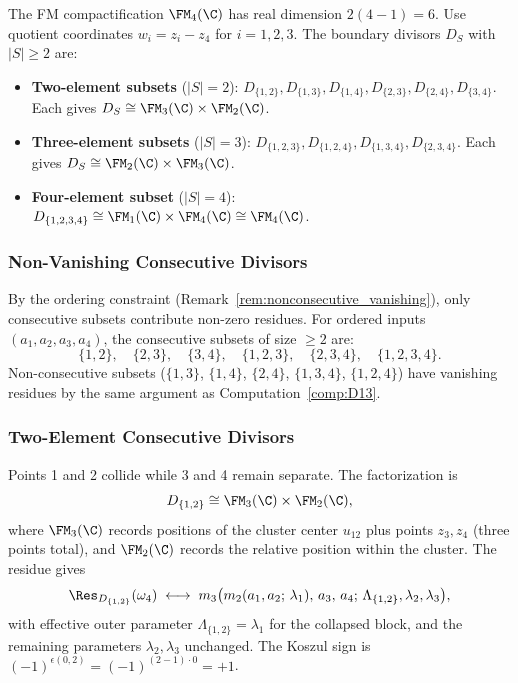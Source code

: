 The FM compactification $\FM_4(\C)$ has real dimension $2(4-1) = 6$. Use quotient coordinates $w_i = z_i - z_4$ for $i = 1, 2, 3$. The boundary divisors $D_S$ with $|S| \geq 2$ are:
\begin{itemize}
\item \textbf{Two-element subsets} ($|S|=2$): $D_{\{1,2\}}, D_{\{1,3\}}, D_{\{1,4\}}, D_{\{2,3\}}, D_{\{2,4\}}, D_{\{3,4\}}$. Each gives $D_S \cong \FM_3(\C) \times \FM_2(\C)$.
\item \textbf{Three-element subsets} ($|S|=3$): $D_{\{1,2,3\}}, D_{\{1,2,4\}}, D_{\{1,3,4\}}, D_{\{2,3,4\}}$. Each gives $D_S \cong \FM_2(\C) \times \FM_3(\C)$.
\item \textbf{Four-element subset} ($|S|=4$): $D_{\{1,2,3,4\}} \cong \FM_1(\C) \times \FM_4(\C) \cong \FM_4(\C)$.
\end{itemize}

\subsubsection{Non-Vanishing Consecutive Divisors}

By the ordering constraint (Remark~\ref{rem:nonconsecutive_vanishing}), only consecutive subsets contribute non-zero residues. For ordered inputs $(a_1, a_2, a_3, a_4)$, the consecutive subsets of size $\geq 2$ are:
\[
\{1,2\},\quad \{2,3\},\quad \{3,4\},\quad \{1,2,3\},\quad \{2,3,4\},\quad \{1,2,3,4\}.
\]
Non-consecutive subsets ($\{1,3\}$, $\{1,4\}$, $\{2,4\}$, $\{1,3,4\}$, $\{1,2,4\}$) have vanishing residues by the same argument as Computation~\ref{comp:D13}.

\subsubsection{Two-Element Consecutive Divisors}

\begin{computation}[$D_{\{1,2\}}$ in $\FM_4(\C)$]
Points 1 and 2 collide while 3 and 4 remain separate. The factorization is
\[
D_{\{1,2\}} \cong \FM_3(\C) \times \FM_2(\C),
\]
where $\FM_3(\C)$ records positions of the cluster center $u_{12}$ plus points $z_3, z_4$ (three points total), and $\FM_2(\C)$ records the relative position within the cluster. The residue gives
\[
\Res_{D_{\{1,2\}}}(\omega_4) \;\longleftrightarrow\; m_3\bigl(m_2(a_1, a_2;\, \lambda_1),\, a_3,\, a_4;\, \Lambda_{\{1,2\}}, \lambda_2, \lambda_3\bigr),
\]
with effective outer parameter $\Lambda_{\{1,2\}} = \lambda_1$ for the collapsed block, and the remaining parameters $\lambda_2, \lambda_3$ unchanged. The Koszul sign is $(-1)^{\epsilon(0,2)} = (-1)^{(2-1)\cdot 0} = +1$.
\end{computation}

